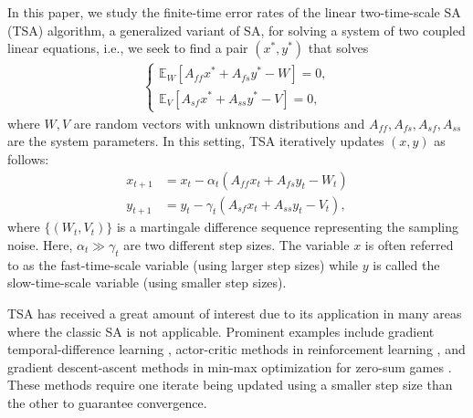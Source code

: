 In this paper, we study the finite-time error rates of the linear two-time-scale SA (TSA) algorithm, a generalized variant of SA, for solving a system of two coupled linear equations, i.e., we seek to find a pair $(x^{*},y^{*})$ that solves 
\begin{align}\label{eq:problem}
\left\{\begin{array}{ll}
\mathbb{E}_{W}[A_{ff}x^{*}+A_{fs}y^{*}-W] = 0,\\
\mathbb{E}_{V}[A_{sf}x^{*}+A_{ss}y^{*}-V] = 0,
\end{array}\right.    
\end{align}
where $W, V$ are random vectors with unknown distributions and $A_{ff}, A_{fs}, A_{sf}, A_{ss}$ are the system parameters. 
In this setting, TSA iteratively updates $(x,y)$ as follows:
%
\begin{equation}
    \begin{split}
        x_{t+1} &= x_t - \alpha_t \left(A_{ff} x_t + A_{fs} y_t - W_t \right) \\ 
        y_{t+1} &= y_t - \gamma_t \left(A_{sf} x_t + A_{ss} y_t - V_t \right), 
    \end{split}
    \label{eq:ttsa_general}
\end{equation}
where $\{(W_t, V_t)\}$ is a martingale difference sequence representing the sampling noise. Here, $\alpha_{t}\gg\gamma_{t}$ are two different step sizes. The variable $x$ is often referred to as the fast-time-scale variable (using larger step sizes) while $y$ is called the slow-time-scale variable (using smaller step sizes).%




TSA has received a great amount of interest due to its application in many areas where the classic SA is not applicable. Prominent examples include gradient temporal-difference learning \citep{sutton2008convergent,sutton2009fast,xu2019two}, actor-critic methods in reinforcement learning \citep{konda1999actor,bhatnagar2012stochastic,harsh19,wu2020finite,zeng2024accelerated}, and gradient descent-ascent methods in min-max optimization for zero-sum games \citep{zeng2022regularized}. These methods require one iterate being updated using a smaller step size than the other to guarantee convergence.  




